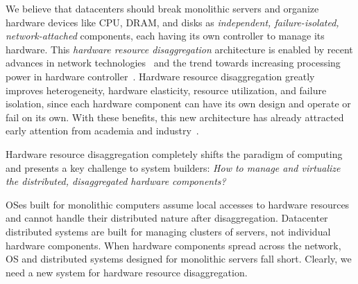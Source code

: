 \documentclass[10pt,times,twocolumn]{z2-article}
\begin{document}
We believe that datacenters should break monolithic servers
and organize hardware devices like CPU, DRAM, and disks 
as {\em independent, failure-isolated, network-attached} components,
each having its own controller to manage its hardware.
This {\em hardware resource disaggregation} architecture %
is enabled by recent advances in network technologies~\cite{IB-RTT,GenZ,Mellanox-ConnectX6,OpenCAPI,Omni-Path,ccix} 
and the trend towards increasing processing power in hardware controller~\cite{Willow,Ahn15-PIM,Bojnordi12}.
Hardware resource disaggregation greatly improves heterogeneity, hardware elasticity, 
resource utilization, and failure isolation,
since each hardware component can have its own design and operate or fail on its own.
With these benefits, this new architecture has already attracted early attention 
from academia and industry~\cite{OCP,HP-TheMachine,FireBox-FASTKeynote,Lim09-disaggregate,Nitu18-EUROSYS,dRedBox-DATE}.


Hardware resource disaggregation completely shifts the paradigm of computing
and presents a key challenge to system builders:
{\em How to manage and virtualize the distributed, disaggregated hardware components?}

OSes built for monolithic computers assume local accesses to hardware resources 
and cannot handle their distributed nature after disaggregation. 
Datacenter distributed systems are built for managing clusters of servers, not individual hardware components. 
When hardware components spread across the network, OS and distributed systems designed for monolithic servers fall short.
Clearly, we need a new system for hardware resource disaggregation.
\end{document}
